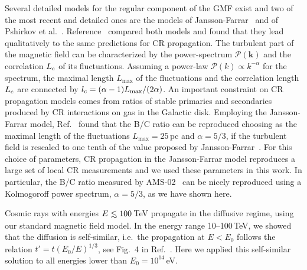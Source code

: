 \documentclass[prd,aps,twocolumn]{revtex4}
\renewcommand{\vec}[1]{\boldsymbol{#1}}
\def\lsim{\raise0.3ex\hbox{$\;<$\kern-0.75em\raise-1.1ex\hbox{$\sim\;$}}}
\begin{document}
Several detailed models for the regular component of the GMF exist
and two of the most recent and detailed ones are the models of
Jansson-Farrar~\cite{JF} and of Pshirkov et al.~\cite{Ps}.
Reference~\cite{0} compared both models and found that they lead
qualitatively to the same predictions for CR propagation. 
The turbulent part of the magnetic field can be characterized by the 
power-spectrum $\mathcal{P}(\vec k)$ and the correlation $L_{\rm c}$ of 
its fluctuations. Assuming a power-law $\mathcal{P}(k)\propto k^{-\alpha}$
for the spectrum,  the maximal length  $L_{\max}$ of the 
fluctuations and the correlation length $L_{\rm c}$ are connected by 
$l_{\rm c} = (\alpha-1) L_{\max}/ (2\alpha)$.
An important constraint on CR propagation models comes from ratios of 
stable primaries and secondaries produced by CR interactions on gas 
in the Galactic disk.  Employing the 
Jansson-Farrar  model, Ref.~\cite{0} found that the  B/C ratio 
can be reproduced choosing as the maximal length of the fluctuations 
$L_{\max} = 25$\,pc and $\alpha=5/3$, if the turbulent field is rescaled 
to one tenth of the value proposed by Jansson-Farrar~\cite{JF}.
For this choice of parameters, CR propagation in the Jansson-Farrar 
model reproduces a large set of local CR measurements and we used these
parameters in this work. In particular, the B/C ratio measured by
AMS-02~\cite{AMS02_BC} can be nicely reproduced using a Kolmogoroff power
spectrum, $\alpha=5/3$, as we have shown here.



Cosmic rays with energies  $E\lsim 100$\,TeV propagate in the diffusive 
regime, using our standard magnetic field model. In the energy range 
10--100\,TeV, we showed that the diffusion is self-similar, i.e.\ the 
propagation at $E<E_0$ follows the relation $t' = t (E_0/E)^{1/3}$, see 
Fig.~4 in Ref.~\cite{PRL}. Here we applied this self-similar solution to 
all energies lower than $E_0=10^{14}$\,eV. 
\end{document}
